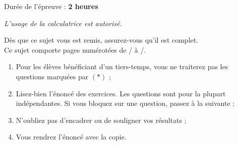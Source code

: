 \begin{center}
    \begin{large}
        Durée de l'épreuve : \textbf{2 heures}\\
    \end{large}
\end{center}
\vspace{1cm}
\begin{center}
    \begin{large}
        \textit{L'usage de la calculatrice est autorisé.}\\
    \end{large}
\end{center}
\vspace{1cm}
\begin{center}
    \begin{large}
        Dès que ce sujet vous est remis, assurez-vous qu’il est complet.\\
        Ce sujet comporte \pageref{LastPage} pages numérotées de \thepage/\pageref{LastPage} à \pageref{LastPage}/\pageref{LastPage}.
    \end{large}
\end{center}

\begin{tcolorbox}[colback=red!5!white,colframe=red!75!black,title=\textbf{Consignes : }]
   \begin{enumerate}
       \item Pour les élèves bénéficiant d'un tiers-temps, vous ne traiterez pas les questions marquées par $(*)$ ; 
       \item Lisez-bien l'énoncé des exercices. Les questions sont pour la plupart indépendantes. Si vous bloquez sur une question, passez à la suivante ;
       \item N'oubliez pas d'encadrer ou de souligner vos résultats ;
       \item Vous rendrez l'énoncé avec la copie.
   \end{enumerate}
\end{tcolorbox}
\newpage




